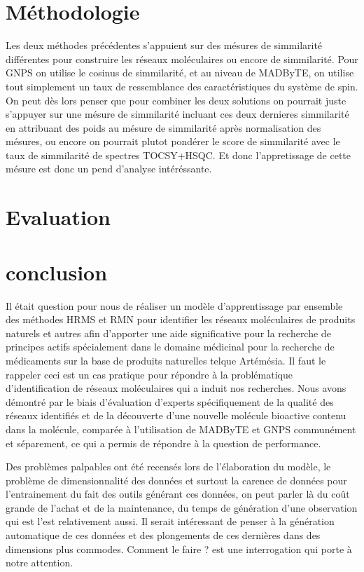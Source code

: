 \documentclass[letterpaper,twocolumn,10pt]{article}
\begin{document}
\section{Méthodologie}
Les deux méthodes précédentes s'appuient sur des mésures de simmilarité différentes pour construire les réseaux moléculaires ou encore de simmilarité. Pour GNPS on utilise le cosinus de simmilarité, et au niveau de MADByTE, on utilise tout simplement un taux de ressemblance des caractéristiques du système de spin. On peut dès lors penser que pour combiner les deux solutions on pourrait juste s'appuyer sur une mésure de simmilarité incluant ces deux dernieres simmilarité en attribuant des poids au mésure de simmilarité après normalisation des mésures, ou encore on pourrait plutot pondérer le score de simmilarité avec le taux de simmilarité de spectres TOCSY+HSQC. Et donc l'appretissage de cette mésure est donc un pend d'analyse intéréssante.

\section{Evaluation}

\section{conclusion}
Il était question pour nous de réaliser un modèle d’apprentissage par ensemble des méthodes HRMS et RMN pour identifier les réseaux moléculaires de produits naturels et autres afin d’apporter une aide significative pour la recherche de principes actifs spécialement dans le domaine médicinal pour la recherche de médicaments sur la base de produits naturelles telque Artémésia. Il faut le rappeler ceci est un cas pratique pour répondre à la problématique d'identification de réseaux moléculaires qui a induit nos recherches. Nous avons démontré par le biais d'évaluation d'experts spécifiquement de la qualité des réseaux identifiés et de la découverte d'une nouvelle molécule bioactive contenu dans la molécule, comparée à l'utilisation de MADByTE et GNPS communément et séparement, ce qui a permis de répondre à la question de performance.

Des problèmes palpables ont été recensés lors de l’élaboration du modèle, le problème de dimensionnalité des données et surtout la carence de données pour l’entrainement du fait des outils générant ces données, on peut parler là du coût grande de l’achat et de la maintenance, du temps de génération d’une observation qui est l’est relativement aussi. Il serait intéressant de penser à la génération automatique de ces données et des plongements de ces dernières dans des dimensions plus commodes. Comment le faire ? est une interrogation qui porte à notre attention.

{\footnotesize 
}


\end{document}
